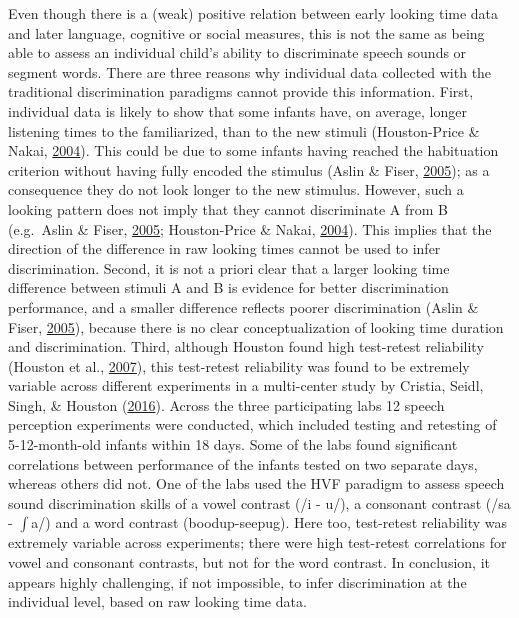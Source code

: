 \documentclass[openright,titlepage,12pt,a4paper]{book}
\begin{document}
Even though there is a (weak) positive relation between early looking time data and later language, cognitive or social measures, this is not the same as being able to assess an individual child's ability to discriminate speech sounds or segment words. There are three reasons why individual data collected with the traditional discrimination paradigms cannot provide this information. First, individual data is likely to show that some infants have, on average, longer listening times to the familiarized, than to the new stimuli (Houston-Price \& Nakai, \protect\hyperlink{ref-houston-price_distinguishing_2004}{2004}). This could be due to some infants having reached the habituation criterion without having fully encoded the stimulus (Aslin \& Fiser, \protect\hyperlink{ref-aslin_methodological_2005}{2005}); as a consequence they do not look longer to the new stimulus. However, such a looking pattern does not imply that they cannot discriminate A from B (e.g.~Aslin \& Fiser, \protect\hyperlink{ref-aslin_methodological_2005}{2005}; Houston-Price \& Nakai, \protect\hyperlink{ref-houston-price_distinguishing_2004}{2004}). This implies that the direction of the difference in raw looking times cannot be used to infer discrimination. Second, it is not a priori clear that a larger looking time difference between stimuli A and B is evidence for better discrimination performance, and a smaller difference reflects poorer discrimination (Aslin \& Fiser, \protect\hyperlink{ref-aslin_methodological_2005}{2005}), because there is no clear conceptualization of looking time duration and discrimination. Third, although Houston found high test-retest reliability (Houston et al., \protect\hyperlink{ref-houston_assessing_2007}{2007}), this test-retest reliability was found to be extremely variable across different experiments in a multi-center study by Cristia, Seidl, Singh, \& Houston (\protect\hyperlink{ref-cristia_test-retest_2016}{2016}). Across the three participating labs 12 speech perception experiments were conducted, which included testing and retesting of 5-12-month-old infants within 18 days. Some of the labs found significant correlations between performance of the infants tested on two separate days, whereas others did not. One of the labs used the HVF paradigm to assess speech sound discrimination skills of a vowel contrast (/i - u/), a consonant contrast (/sa - \(\int\)a/) and a word contrast (boodup-seepug). Here too, test-retest reliability was extremely variable across experiments; there were high test-retest correlations for vowel and consonant contrasts, but not for the word contrast. In conclusion, it appears highly challenging, if not impossible, to infer discrimination at the individual level, based on raw looking time data.
\end{document}
